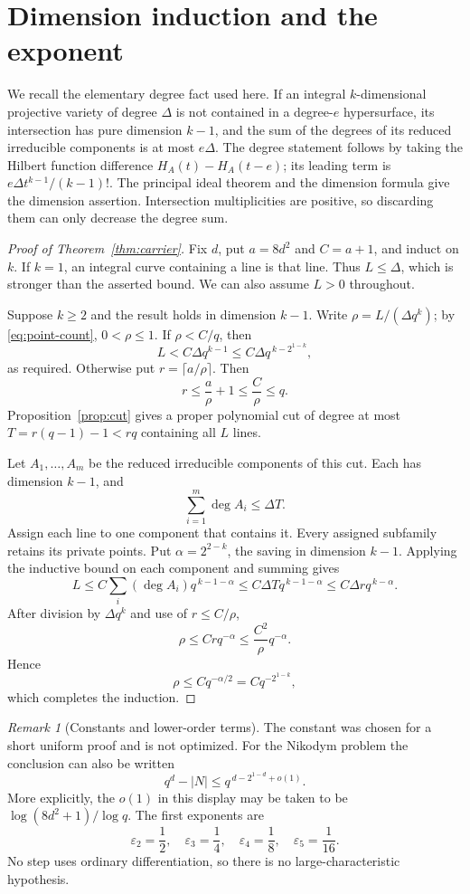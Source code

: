 \documentclass[11pt]{article}
\theoremstyle{remark}
\newtheorem{remark}[theorem]{Remark}
\begin{document}
\section{Dimension induction and the exponent}

We recall the elementary degree fact used here. If an integral
$k$-dimensional projective variety of degree $\Delta$ is not
contained in a degree-$e$ hypersurface, its intersection has
pure dimension $k-1$, and the sum of the degrees of its reduced
irreducible components is at most $e\Delta$. The degree statement
follows by taking the Hilbert function difference
$H_A(t)-H_A(t-e)$; its leading term is
$e\Delta t^{k-1}/(k-1)!$. The principal ideal theorem and the
dimension formula give the dimension assertion. Intersection
multiplicities are positive, so discarding them can only decrease
the degree sum.

\begin{proof}[Proof of Theorem~\ref{thm:carrier}]
Fix $d$, put $a=8d^2$ and $C=a+1$, and induct on $k$.
If $k=1$, an integral curve containing a line is that line.
Thus $L\le\Delta$, which is stronger than the asserted bound.
We can also assume $L>0$ throughout.

Suppose $k\ge2$ and the result holds in dimension $k-1$.
Write $\rho=L/(\Delta q^k)$; by \eqref{eq:point-count},
$0<\rho\le1$. If $\rho<C/q$, then
\[
 L<C\Delta q^{k-1}\le C\Delta q^{\,k-2^{1-k}},
\]
as required. Otherwise put $r=\lceil a/\rho\rceil$.
Then
\[
 r\le\frac a\rho+1\le\frac C\rho\le q.
\]
Proposition~\ref{prop:cut} gives a proper polynomial cut of
degree at most $T=r(q-1)-1<rq$ containing all $L$ lines.

Let $A_1,\ldots,A_m$ be the reduced irreducible components
of this cut. Each has dimension $k-1$, and
\[
 \sum_{i=1}^m\deg A_i\le\Delta T.
\]
Assign each line to one component that contains it. Every
assigned subfamily retains its private points. Put
$\alpha=2^{2-k}$, the saving in dimension $k-1$.
Applying the inductive bound on each component and summing gives
\[
 L\le C\sum_i(\deg A_i)q^{\,k-1-\alpha}
 \le C\Delta Tq^{\,k-1-\alpha}
 \le C\Delta r q^{\,k-\alpha}.
\]
After division by $\Delta q^k$ and use of $r\le C/\rho$,
\[
 \rho\le Crq^{-\alpha}
 \le\frac{C^2}{\rho}q^{-\alpha}.
\]
Hence
\[
 \rho\le Cq^{-\alpha/2}
       =Cq^{-2^{1-k}},
\]
which completes the induction.
\end{proof}

\begin{remark}[Constants and lower-order terms]
The constant was chosen for a short uniform proof and is not optimized.
For the Nikodym problem the conclusion can also be written
\[
 q^d-|N|\le q^{\,d-2^{1-d}+o(1)}.
\]
More explicitly, the $o(1)$ in this display may be taken to be
$\log(8d^2+1)/\log q$. The first exponents are
\[
 \varepsilon_2=\frac12,\quad
 \varepsilon_3=\frac14,\quad
 \varepsilon_4=\frac18,\quad
 \varepsilon_5=\frac1{16}.
\]
No step uses ordinary differentiation, so there is no
large-characteristic hypothesis.
\end{remark}
\end{document}
